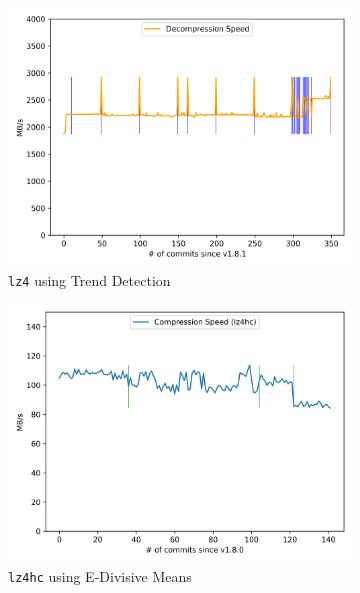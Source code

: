 \documentclass[	runningheads,
				a4paper]{llncs}
\begin{document}
\begin{figure}[ht!]
\begin{subfigure}[b]{0.3\textwidth}
		\includegraphics[width=\textwidth]{graph/lz4_commit_trend}
		\caption{\texttt{lz4} using Trend Detection}
	\end{subfigure}
	\begin{subfigure}[b]{0.3\textwidth}
		\includegraphics[width=\textwidth]{graph/lz4hc_commit_e-divisive}
		\caption{\texttt{lz4hc} using E-Divisive Means}
	\end{subfigure}
	\begin{subfigure}[b]{0.3\textwidth}

\end{subfigure}
\end{figure}
\end{document}
